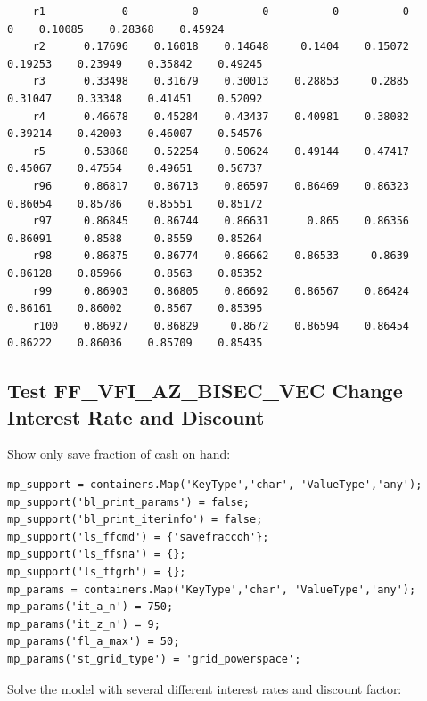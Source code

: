 \documentclass[
]{book}
\begin{document}
\begin{verbatim}
    r1            0          0          0          0          0          0    0.10085    0.28368    0.45924
    r2      0.17696    0.16018    0.14648     0.1404    0.15072    0.19253    0.23949    0.35842    0.49245
    r3      0.33498    0.31679    0.30013    0.28853     0.2885    0.31047    0.33348    0.41451    0.52092
    r4      0.46678    0.45284    0.43437    0.40981    0.38082    0.39214    0.42003    0.46007    0.54576
    r5      0.53868    0.52254    0.50624    0.49144    0.47417    0.45067    0.47554    0.49651    0.56737
    r96     0.86817    0.86713    0.86597    0.86469    0.86323    0.86054    0.85786    0.85551    0.85172
    r97     0.86845    0.86744    0.86631      0.865    0.86356    0.86091     0.8588     0.8559    0.85264
    r98     0.86875    0.86774    0.86662    0.86533     0.8639    0.86128    0.85966     0.8563    0.85352
    r99     0.86903    0.86805    0.86692    0.86567    0.86424    0.86161    0.86002     0.8567    0.85395
    r100    0.86927    0.86829     0.8672    0.86594    0.86454    0.86222    0.86036    0.85709    0.85435
\end{verbatim}

\hypertarget{test-ff_vfi_az_bisec_vec-change-interest-rate-and-discount}{%
\subsection{Test FF\_VFI\_AZ\_BISEC\_VEC Change Interest Rate and Discount}\label{test-ff_vfi_az_bisec_vec-change-interest-rate-and-discount}}

Show only save fraction of cash on hand:

\begin{verbatim}
mp_support = containers.Map('KeyType','char', 'ValueType','any');
mp_support('bl_print_params') = false;
mp_support('bl_print_iterinfo') = false;
mp_support('ls_ffcmd') = {'savefraccoh'};
mp_support('ls_ffsna') = {};
mp_support('ls_ffgrh') = {};
mp_params = containers.Map('KeyType','char', 'ValueType','any');
mp_params('it_a_n') = 750;
mp_params('it_z_n') = 9;
mp_params('fl_a_max') = 50;
mp_params('st_grid_type') = 'grid_powerspace';
\end{verbatim}

Solve the model with several different interest rates and discount
factor:
\end{document}
